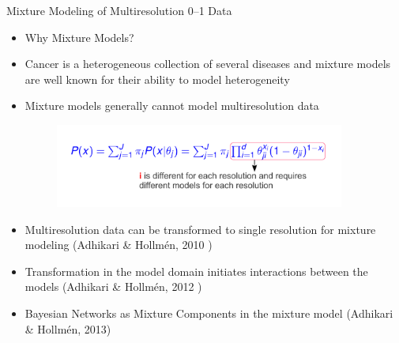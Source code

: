 \documentclass[first=dgreen,second=purple,logo=redexc]{aaltoslides}
\begin{document}

\begin{frame} {Mixture Modeling of Multiresolution 0--1 Data} 
\small
\begin{itemize}\setlength{\itemsep}{1mm}
    \item {\color{red} {Why Mixture Models?}}
    \item Cancer is a heterogeneous collection of several diseases and mixture models are well known for their ability to model heterogeneity
    \item Mixture models generally cannot model multiresolution data
    
    \vspace{-2mm}
    
      \begin{figure}
      \centering
      \includegraphics[trim=1cm 1.3cm 1cm 1.3cm, clip=true, width=0.9\textwidth]{figures/multieq}
      \end{figure}
      
          \vspace{-2mm}
   
     \item Multiresolution data can be transformed to single resolution for mixture modeling (Adhikari \& Hollm\'en, 2010 )
     \item Transformation in the model domain initiates interactions between the models (Adhikari \& Hollm\'en, 2012 )
     \item Bayesian Networks as Mixture Components in the mixture model (Adhikari \& Hollm\'en, 2013)
\end{itemize}
\end{frame}

\end{document}
